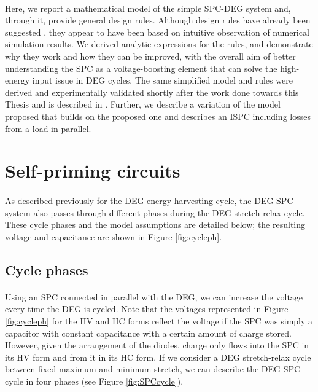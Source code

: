 \paragraph{}Here, we report a mathematical model of the simple SPC-DEG system and, through it, provide general design rules. Although design rules have already been suggested \cite{SPCdesign}, they appear to have been based on intuitive observation of numerical simulation results. We derived analytic expressions for the rules, and demonstrate why they work and how they can be improved, with the overall aim of better understanding the SPC as a voltage-boosting element that can solve the high-energy input issue in DEG cycles. The same simplified model and rules were derived and experimentally validated shortly after the work done towards this Thesis and is described in \cite{spcpatrin}. Further, we describe a variation of the model proposed that builds on the proposed one and describes an ISPC including losses from a load in parallel.


\section{Self-priming circuits}

\paragraph{}  As described previously for the DEG energy harvesting cycle, the DEG-SPC system also passes through different phases during the DEG stretch-relax cycle. These cycle phases and the model assumptions are detailed below; the resulting voltage and capacitance are shown in Figure \ref{fig:cycleph}.

\subsection{Cycle phases}

\paragraph{} Using an SPC connected in parallel with the  DEG, we can increase the voltage every time the DEG is cycled.  Note that the voltages represented in Figure \ref{fig:cycleph} for the HV and HC forms reflect the voltage if the SPC was simply a capacitor with constant capacitance with a certain amount of charge stored. However, given the arrangement of the diodes,  charge only flows into the SPC in its HV form and from it in its HC form.  If we consider a DEG stretch-relax cycle between fixed  maximum and minimum stretch, we can describe the DEG-SPC cycle in four phases (see Figure \ref{fig:SPCcycle}).

